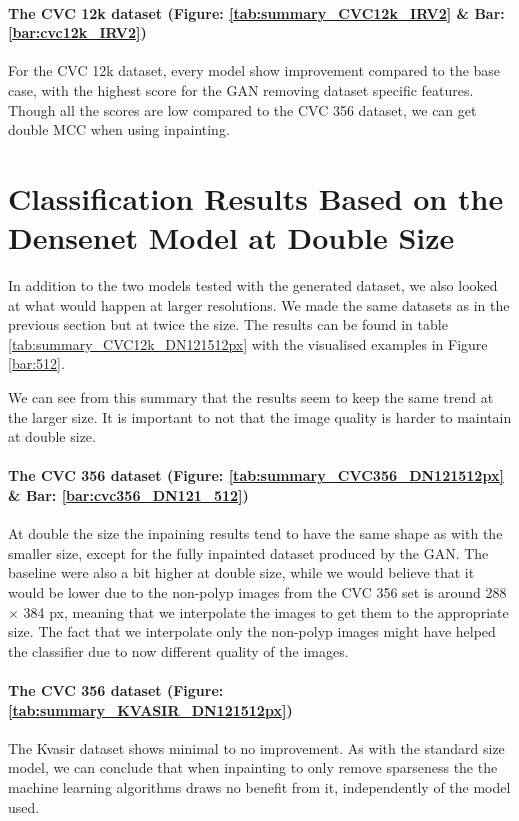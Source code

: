 \paragraph{The CVC 12k dataset (Figure: \ref{tab:summary_CVC12k_IRV2} \& Bar: \ref{bar:cvc12k_IRV2})}
For the CVC 12k dataset, every model show improvement compared to the base case, with the highest score for the GAN removing dataset specific features. Though all the scores are low compared to the CVC 356 dataset, we can get double MCC when using inpainting.



\section{Classification Results Based on the Densenet Model at Double Size}
In addition to the two models tested with the generated dataset, we also looked at what would happen at larger resolutions. We made the same datasets as in the previous section but at twice the size. The results can be found in table \ref{tab:summary_CVC12k_DN121512px} with the visualised examples in Figure \ref{bar:512}.

We can see from this summary that the results seem to keep the same trend at the larger size.
It is important to not that the image quality is harder to maintain at double size.


\paragraph{The CVC 356 dataset (Figure: \ref{tab:summary_CVC356_DN121512px} \& Bar: \ref{bar:cvc356_DN121_512})}
At double the size the inpaining results tend to have the same shape as with the smaller size, except for the fully inpainted dataset produced by the GAN.  The baseline were also a bit higher at double size, while we would believe that it would be lower due to the non-polyp images from the CVC 356 set is around 288 $\times$ 384 px, meaning that we interpolate the images to get them to the appropriate size. The fact that we interpolate only the non-polyp images might have helped the classifier due to now different quality of the images.

\paragraph{The CVC 356 dataset (Figure: \ref{tab:summary_KVASIR_DN121512px})}
The Kvasir dataset shows minimal to no improvement. As with the standard size model, we can conclude that when inpainting to only remove sparseness the the machine learning algorithms draws no benefit from it, independently of the model used.

